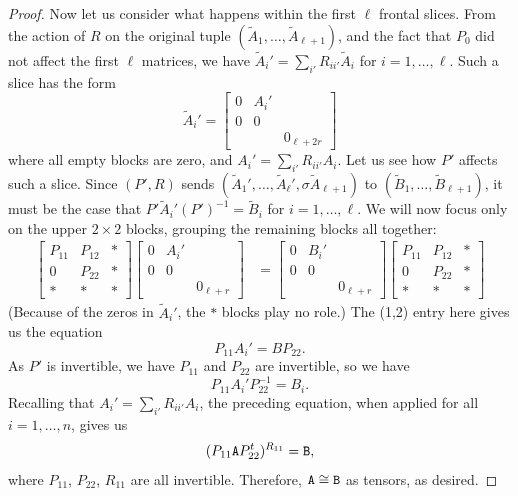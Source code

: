 \begin{proof}
	Now let us consider what happens within the first $\ell$ frontal slices. From the action of $R$ on the original tuple $(\tilde A_1, \dotsc, \tilde A_{\ell+1})$, and the fact that $P_0$ did not affect the first $\ell$ matrices, we have $\tilde A_i' = \sum_{i'} R_{ii'} \tilde A_i$ for $i=1,\dotsc,\ell$. Such a slice has the form
	\[
	\tilde A_i' = \begin{bmatrix}
		0 & A_i' \\
		0 & 0 \\
		& & 0_{\ell+2r}
	\end{bmatrix}
	\]
	where all empty blocks are zero, and $A_i' = \sum_{i'} R_{ii'} A_i$. Let us see how $P'$ affects such a slice. Since $(P',R)$ sends $(\tilde A_1', \dotsc, \tilde A_{\ell}', \sigma \tilde A_{\ell+1})$ to $(\tilde B_1, \dotsc, \tilde B_{\ell+1})$, it must be the case that $P' \tilde A_i' (P')^{-1} = \tilde B_i$ for $i=1,\dotsc,\ell$. We will now focus only on the upper $2 \times 2$ blocks, grouping the remaining blocks all together:
	\begin{align*}
		\begin{bmatrix} 
			P_{11} & P_{12} & * \\
			0 & P_{22} & * \\
			* & * & *
		\end{bmatrix}
		\begin{bmatrix}
			0 & A_i' \\
			0 & 0 \\
			& & 0_{\ell+r}
		\end{bmatrix}
		& =
		\begin{bmatrix}
			0 & B_i' \\
			0 & 0 \\
			& & 0_{\ell+r}
		\end{bmatrix}
		\begin{bmatrix} 
			P_{11} & P_{12}& * \\
			0 & P_{22} & *  \\
			* & * & *
		\end{bmatrix}
	\end{align*}
	(Because of the zeros in $\tilde A_i'$, the $*$ blocks play no role.) The (1,2) entry here gives us the equation
	\[
	P_{11}A_i'=BP_{22}.
	\]
	As $P'$ is invertible, we have $P_{11}$ and $P_{22}$ are invertible, so we have
	\[
	P_{11} A_i' P_{22}^{-1} = B_i.
	\]
	Recalling that $A_i' = \sum_{i'} R_{ii'} A_i$, the preceding equation, when applied for all $i=1,\dotsc,n$, gives us
	\begin{equation}\label{eq:coset}
		(P_{11} \mathtt{A} P_{22}^t)^{R_{11}} = \mathtt{B},
	\end{equation}
	where $P_{11}$, $P_{22}$, $R_{11}$ are all invertible. Therefore, $\mathtt{A} \cong \mathtt{B}$ as tensors, as desired.
\end{proof}

